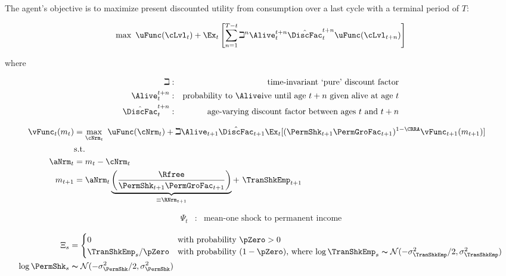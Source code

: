 The agent's objective is to maximize present discounted utility from consumption over a last cycle with a terminal period of $T$:

\begin{equation}\label{eq:MaxProb}
    \max ~ \uFunc({\cLvl}_{t}) + \Ex_{t}\left[ \sum_{n=1}^{T-t} {\beth}^{n} \Alive_{t}^{t+n}
        \hat{\DiscFac}_{t}^{t+n} \uFunc({\cLvl}_{t+n})\right]
\end{equation}

where

\begin{align}
    \beth & : & \text{time-invariant `pure' discount factor}
    \\ \Alive _{t}^{t+n} & : & \text{probability to }\Alive\text{ive until age $t+n$ given alive at age $t$}
    \\ \hat{\DiscFac}_{t}^{t+n} & : & \text{age-varying discount factor between ages $t$ and $t+n$}
\end{align}



\begin{align}
    {\vFunc}_{t}({m}_{t}) & = \max_{\cNrm_{t}} ~ \uFunc(\cNrm_{t})+\beth\Alive_{t+1}\hat{\DiscFac}_{t+1}
    \Ex_{t}[(\PermShk_{t+1}\PermGroFac_{t+1})^{1-\CRRA}{\vFunc}_{t+1}({m}_{t+1})]
    \\ & \text{s.t.} & \nonumber
    \\ \aNrm_{t} & = {m}_{t}-\cNrm_{t} \nonumber
    \\ {m}_{t+1} & = \aNrm_{t}\underbrace{\left(\frac{\Rfree}{\PermShk_{t+1}\PermGroFac_{t+1}}\right)}_{\equiv \RNrm_{t+1}}
    + ~\TranShkEmp_{t+1}
\end{align}

\begin{align}
    \Psi_{t} & : & \text{mean-one shock to permanent income}
\end{align}



\begin{align}
    \Xi_{s} & =
    \begin{cases}
        0\phantom{/\pZero} & \text{with probability $\pZero>0$}
        \\ \TranShkEmp_{s}/\pZero & \text{with probability $(1-\pZero)$, where
            $\log \TranShkEmp_{s}\thicksim \mathcal{N}(-\sigma_{\TranShkEmp}^{2}/2,\sigma_{\TranShkEmp}^{2})$}
    \end{cases}
    \\ \log \PermShk_{s} & \thicksim \mathcal{N}(-\sigma_{\PermShk}^{2}/2,\sigma_{\PermShk}^{2})
\end{align}

